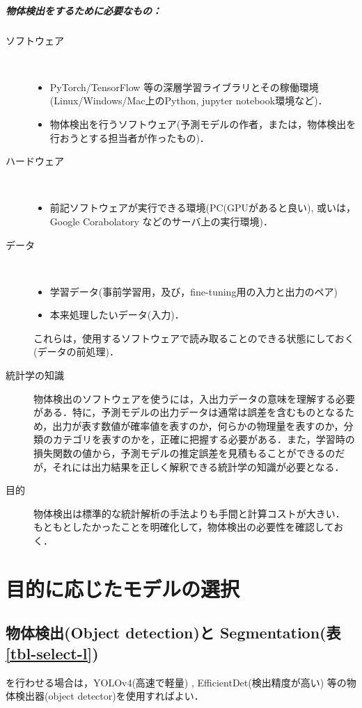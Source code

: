 \documentclass[twocolumn]{jsarticle} %
\begin{document}
\subparagraph{物体検出をするために必要なもの：}
\begin{description}
    \item[ソフトウェア]　
    \begin{itemize}
        \item PyTorch/TensorFlow 等の深層学習ライブラリとその稼働環境(Linux/Windows/Mac上のPython, jupyter notebook環境など)．
        \item 物体検出を行うソフトウェア(予測モデルの作者，または，物体検出を行おうとする担当者が作ったもの)．
    \end{itemize}
    \item[ハードウェア]　
    \begin{itemize}
        \item 前記ソフトウェアが実行できる環境(PC(GPUがあると良い), 或いは，Google Corabolatory などのサーバ上の実行環境)．
    \end{itemize}
    \item[データ]　
    \begin{itemize}
        \item 学習データ(事前学習用，及び，fine-tuning用の入力と出力のペア)
        \item 本来処理したいデータ(入力)．
    \end{itemize}
    これらは，使用するソフトウェアで読み取ることのできる状態にしておく(データの前処理)．

    \item[統計学の知識] 物体検出のソフトウェアを使うには，入出力データの意味を理解する必要がある．特に，予測モデルの出力データは通常は誤差を含むものとなるため，出力が表す数値が確率値を表すのか，何らかの物理量を表すのか，分類のカテゴリを表すのかを，正確に把握する必要がある．また，学習時の損失関数の値から，予測モデルの推定誤差を見積もることができるのだが，それには出力結果を正しく解釈できる統計学の知識が必要となる．

    \item[目的] 
    物体検出は標準的な統計解析の手法よりも手間と計算コストが大きい．
    もともとしたかったことを明確化して，物体検出の必要性を確認しておく．
\end{description}

\section{目的に応じたモデルの選択}
\subsection{物体検出(Object detection)と Segmentation(表\ref{tbl-select-l})}
を行わせる場合は，YOLOv4(高速で軽量) \cite{BWL20}, EfficientDet(検出精度が高い) \cite{TPL20}等の物体検出器(object detector)を使用すればよい．
\end{document}
